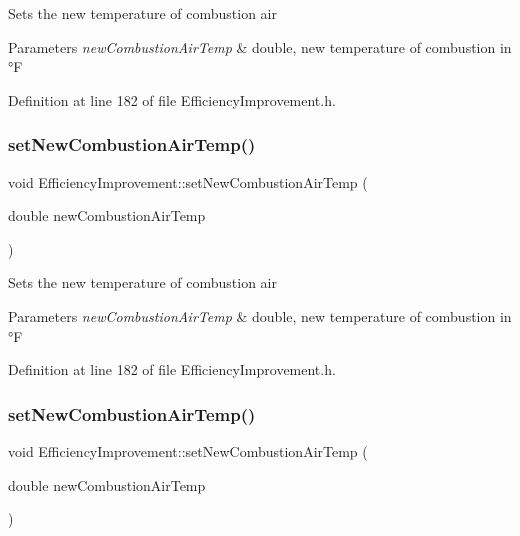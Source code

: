 Sets the new temperature of combustion air


\begin{DoxyParams}{Parameters}
{\em new\+Combustion\+Air\+Temp} & double, new temperature of combustion in °F \\
\hline
\end{DoxyParams}


Definition at line 182 of file Efficiency\+Improvement.\+h.

\mbox{\label{class_efficiency_improvement_a93705877dfad913c6282fbd31e66c41a}} 
\subsubsection{\texorpdfstring{set\+New\+Combustion\+Air\+Temp()}{setNewCombustionAirTemp()}\hspace{0.1cm}{\footnotesize\ttfamily [2/3]}}
{\footnotesize\ttfamily void Efficiency\+Improvement\+::set\+New\+Combustion\+Air\+Temp (\begin{DoxyParamCaption}\item[{double}]{new\+Combustion\+Air\+Temp }\end{DoxyParamCaption})\hspace{0.3cm}{\ttfamily [inline]}}

Sets the new temperature of combustion air


\begin{DoxyParams}{Parameters}
{\em new\+Combustion\+Air\+Temp} & double, new temperature of combustion in °F \\
\hline
\end{DoxyParams}


Definition at line 182 of file Efficiency\+Improvement.\+h.

\mbox{\label{class_efficiency_improvement_a93705877dfad913c6282fbd31e66c41a}} 
\subsubsection{\texorpdfstring{set\+New\+Combustion\+Air\+Temp()}{setNewCombustionAirTemp()}\hspace{0.1cm}{\footnotesize\ttfamily [3/3]}}
{\footnotesize\ttfamily void Efficiency\+Improvement\+::set\+New\+Combustion\+Air\+Temp (\begin{DoxyParamCaption}\item[{double}]{new\+Combustion\+Air\+Temp }\end{DoxyParamCaption})\hspace{0.3cm}{\ttfamily [inline]}}

